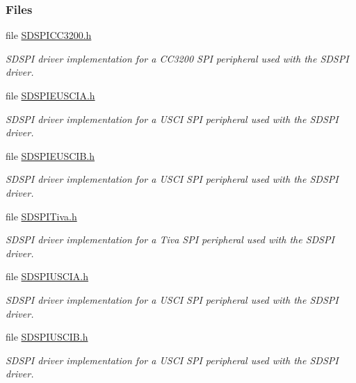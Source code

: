 \subsubsection*{Files}
\begin{DoxyCompactItemize}
\item 
file \hyperlink{_s_d_s_p_i_c_c3200_8h}{S\-D\-S\-P\-I\-C\-C3200.\-h}
\begin{DoxyCompactList}\small\item\em S\-D\-S\-P\-I driver implementation for a C\-C3200 S\-P\-I peripheral used with the S\-D\-S\-P\-I driver. \end{DoxyCompactList}\item 
file \hyperlink{_s_d_s_p_i_e_u_s_c_i_a_8h}{S\-D\-S\-P\-I\-E\-U\-S\-C\-I\-A.\-h}
\begin{DoxyCompactList}\small\item\em S\-D\-S\-P\-I driver implementation for a U\-S\-C\-I S\-P\-I peripheral used with the S\-D\-S\-P\-I driver. \end{DoxyCompactList}\item 
file \hyperlink{_s_d_s_p_i_e_u_s_c_i_b_8h}{S\-D\-S\-P\-I\-E\-U\-S\-C\-I\-B.\-h}
\begin{DoxyCompactList}\small\item\em S\-D\-S\-P\-I driver implementation for a U\-S\-C\-I S\-P\-I peripheral used with the S\-D\-S\-P\-I driver. \end{DoxyCompactList}\item 
file \hyperlink{_s_d_s_p_i_tiva_8h}{S\-D\-S\-P\-I\-Tiva.\-h}
\begin{DoxyCompactList}\small\item\em S\-D\-S\-P\-I driver implementation for a Tiva S\-P\-I peripheral used with the S\-D\-S\-P\-I driver. \end{DoxyCompactList}\item 
file \hyperlink{_s_d_s_p_i_u_s_c_i_a_8h}{S\-D\-S\-P\-I\-U\-S\-C\-I\-A.\-h}
\begin{DoxyCompactList}\small\item\em S\-D\-S\-P\-I driver implementation for a U\-S\-C\-I S\-P\-I peripheral used with the S\-D\-S\-P\-I driver. \end{DoxyCompactList}\item 
file \hyperlink{_s_d_s_p_i_u_s_c_i_b_8h}{S\-D\-S\-P\-I\-U\-S\-C\-I\-B.\-h}
\begin{DoxyCompactList}\small\item\em S\-D\-S\-P\-I driver implementation for a U\-S\-C\-I S\-P\-I peripheral used with the S\-D\-S\-P\-I driver. \end{DoxyCompactList}\end{DoxyCompactItemize}
